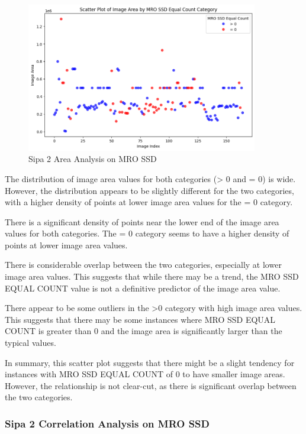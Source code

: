 \begin{figure}[ht]
    \centering
    \includegraphics[width=0.9\textwidth]{Figures/Results/sipa_02/area.png}
    \caption[Sipa 2 Area Analysis on MRO SSD]{Sipa 2 Area Analysis on MRO SSD}
    \label{fig:Sipa 2 Area Analysis on MRO SSD}
\end{figure}


The distribution of image area values for both categories (> 0 and = 0) is wide. However, the distribution appears to be slightly different for the two categories, with a higher density of points at lower image area values for the = 0 category.

There is a significant density of points near the lower end of the image area values for both categories. The = 0 category seems to have a higher density of points at lower image area values.

There is considerable overlap between the two categories, especially at lower image area values. This suggests that while there may be a trend, the MRO SSD EQUAL COUNT value is not a definitive predictor of the image area value.

There appear to be some outliers in the >0 category with high image area values. This suggests that there may be some instances where MRO SSD EQUAL COUNT is greater than 0 and the image area is significantly larger than the typical values.

In summary, this scatter plot suggests that there might be a slight tendency for instances with MRO SSD EQUAL COUNT of 0 to have smaller image areas. However, the relationship is not clear-cut, as there is significant overlap between the two categories.



\newpage

\subsubsection{Sipa 2 Correlation Analysis on MRO SSD}


